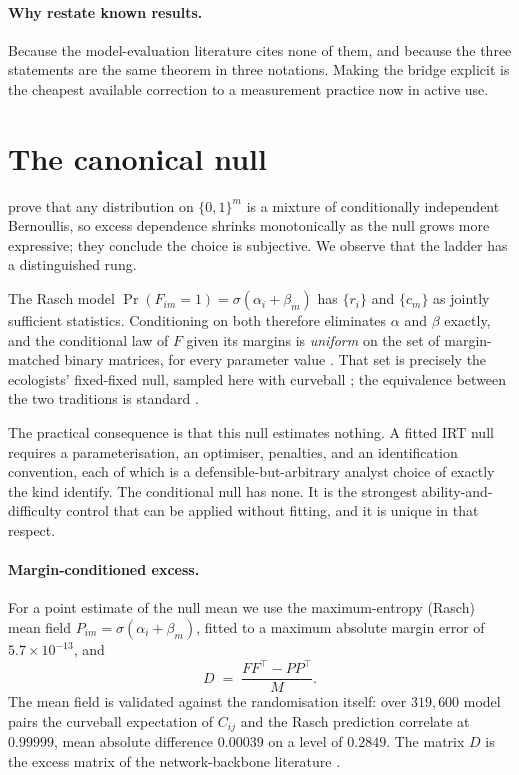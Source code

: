 \documentclass[pdflatex,sn-mathphys-ay]{sn-jnl}
\theoremstyle{thmstyleone}
\theoremstyle{thmstylethree}
\begin{document}
\paragraph{Why restate known results.} Because the model-evaluation literature cites none of
them, and because the three statements are the same theorem in three notations. Making the
bridge explicit is the cheapest available correction to a measurement practice now in active use.

\section{The canonical null}
\label{sec:canonical}

\citet{jo2026subjectivity} prove that any distribution on $\{0,1\}^m$ is a mixture of
conditionally independent Bernoullis, so excess dependence shrinks monotonically as the null
grows more expressive; they conclude the choice is subjective. We observe that the ladder has a
distinguished rung.

The Rasch model $\Pr(F_{im}=1)=\sigma(\alpha_i+\beta_m)$ has $\{r_i\}$ and $\{c_m\}$ as jointly
sufficient statistics. Conditioning on both therefore eliminates $\alpha$ and $\beta$ exactly,
and the conditional law of $F$ given its margins is \emph{uniform} on the set of margin-matched
binary matrices, for every parameter value \citep{rasch1960,andersen1973}. That set is precisely
the ecologists' fixed-fixed null, sampled here with curveball \citep{strona2014}; the
equivalence between the two traditions is standard
\citep{besag1989,ponocny2001,verhelst2008,miller2013}.

The practical consequence is that this null estimates nothing. A fitted IRT null requires a
parameterisation, an optimiser, penalties, and an identification convention, each of which is a
defensible-but-arbitrary analyst choice of exactly the kind \citet{jo2026subjectivity} identify.
The conditional null has none. It is the strongest ability-and-difficulty control that can be
applied without fitting, and it is unique in that respect.

\paragraph{Margin-conditioned excess.} For a point estimate of the null mean we use the
maximum-entropy (Rasch) mean field $P_{im}=\sigma(\alpha_i+\beta_m)$, fitted to a maximum
absolute margin error of $5.7\times10^{-13}$, and
\[
D \;=\; \frac{FF^{\!\top}-PP^{\!\top}}{M}.
\]
The mean field is validated against the randomisation itself: over $319{,}600$ model pairs the
curveball expectation of $C_{ij}$ and the Rasch prediction correlate at $0.99999$, mean absolute
difference $0.00039$ on a level of $0.2849$. The matrix $D$ is the excess matrix of the
network-backbone literature \citep{neal2021}.
\end{document}
